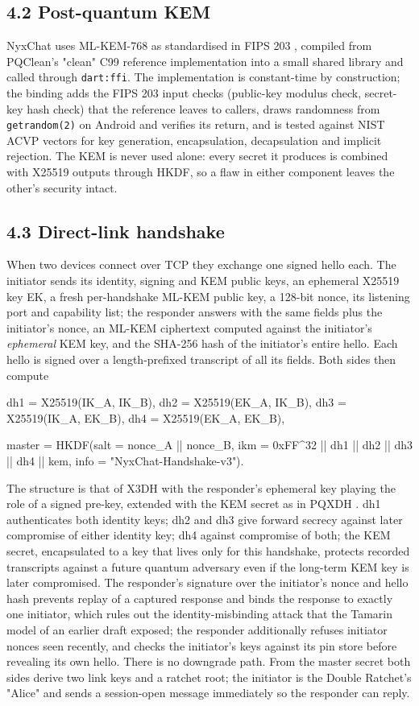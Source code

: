 \documentclass[conference]{IEEEtran}
\begin{document}
\subsection{4.2 Post-quantum KEM}
NyxChat uses ML-KEM-768 as standardised in FIPS 203 \cite{ref5}, compiled from PQClean's "clean" C99 reference implementation \cite{ref24} into a small shared library and called through \texttt{dart:ffi}. The implementation is constant-time by construction; the binding adds the FIPS 203 input checks (public-key modulus check, secret-key hash check) that the reference leaves to callers, draws randomness from \texttt{getrandom(2)} on Android and verifies its return, and is tested against NIST ACVP vectors for key generation, encapsulation, decapsulation and implicit rejection. The KEM is never used alone: every secret it produces is combined with X25519 outputs through HKDF, so a flaw in either component leaves the other's security intact.

\subsection{4.3 Direct-link handshake}
When two devices connect over TCP they exchange one signed hello each. The initiator sends its identity, signing and KEM public keys, an ephemeral X25519 key EK, a fresh per-handshake ML-KEM public key, a 128-bit nonce, its listening port and capability list; the responder answers with the same fields plus the initiator's nonce, an ML-KEM ciphertext computed against the initiator's \emph{ephemeral} KEM key, and the SHA-256 hash of the initiator's entire hello. Each hello is signed over a length-prefixed transcript of all its fields. Both sides then compute

dh1 = X25519(IK\_A, IK\_B), dh2 = X25519(EK\_A, IK\_B), dh3 = X25519(IK\_A, EK\_B), dh4 = X25519(EK\_A, EK\_B),

master = HKDF(salt = nonce\_A || nonce\_B, ikm = 0xFF\textasciicircum{}32 || dh1 || dh2 || dh3 || dh4 || kem, info = "NyxChat-Handshake-v3").

The structure is that of X3DH \cite{ref1} with the responder's ephemeral key playing the role of a signed pre-key, extended with the KEM secret as in PQXDH \cite{ref4}. dh1 authenticates both identity keys; dh2 and dh3 give forward secrecy against later compromise of either identity key; dh4 against compromise of both; the KEM secret, encapsulated to a key that lives only for this handshake, protects recorded transcripts against a future quantum adversary even if the long-term KEM key is later compromised. The responder's signature over the initiator's nonce and hello hash prevents replay of a captured response and binds the response to exactly one initiator, which rules out the identity-misbinding attack that the Tamarin model of an earlier draft exposed; the responder additionally refuses initiator nonces seen recently, and checks the initiator's keys against its pin store before revealing its own hello. There is no downgrade path. From the master secret both sides derive two link keys and a ratchet root; the initiator is the Double Ratchet's "Alice" and sends a session-open message immediately so the responder can reply.
\end{document}
